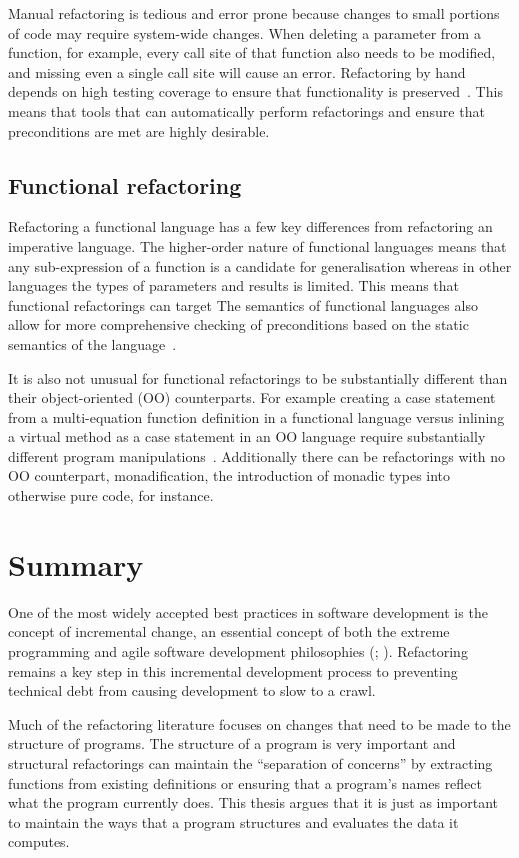 Manual refactoring is tedious and error prone because changes to small portions of code may require system-wide changes. When deleting a parameter from a function, for example, every call site of that function also needs to be modified, and missing even a single call site will cause an error. Refactoring by hand depends on high testing coverage to ensure that functionality is preserved~\citep{fowler}. This means that tools that can automatically perform refactorings and ensure that preconditions are met are highly desirable.

\subsection{Functional refactoring}

Refactoring a functional language has a few key differences from refactoring an imperative language. The higher-order nature of functional languages means that any sub-expression of a function is a candidate for generalisation whereas in other languages the types of parameters and results is limited. This means that functional refactorings can target The semantics of functional languages also allow for more comprehensive checking of preconditions based on the static semantics of the language~\citep{refacTools}.

It is also not unusual for functional refactorings to be substantially different than their object-oriented (OO) counterparts. For example creating a case statement from a multi-equation function definition in a functional language versus inlining a virtual method as a case statement in an OO language require substantially different program manipulations~\citep{huiqingThesis}. Additionally there can be refactorings with no OO counterpart, monadification, the introduction of monadic types into otherwise pure code, for instance.

\section{Summary}

One of the most widely accepted best practices in software development is the concept of incremental change, an essential concept of both the extreme programming and agile software development philosophies (\cite{extremeProg}; \cite{agileManifesto}). Refactoring remains a key step in this incremental development process to preventing technical debt from causing development to slow to a crawl.

Much of the refactoring literature focuses on changes that need to be made to the structure of programs. The structure of a program is very important and structural refactorings can maintain the ``separation of concerns'' by extracting functions from existing definitions or ensuring that a program's names reflect what the program currently does. This thesis argues that it is just as important to maintain the ways that a program structures and evaluates the data it computes.

